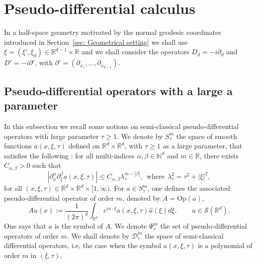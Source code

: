 \documentclass[10pt]{amsart}
\theoremstyle{plain}
\theoremstyle{definition}
\def\R{\mathbb{R}}
\def\N{\mathbb{N}}
\newcommand{\Op}{\ensuremath{\mathrm{Op}}}
\newcommand{\lsc}{\lambda_\tau}
\newcommand{\Ssc}{S_\tau}
\newcommand{\Psisc}{\Psi_\tau}
\newcommand{\Dsc}{\mathscr{D}_{\tau}}
\begin{document}
\section{Pseudo-differential calculus}
\label{sec: Psido}

In a half-space geometry motivated by the normal geodesic coordinates
introduced in Section~\ref{sec: Geometrical setting}
we shall use $\xi=(\xi',\xi_d)\in\R^{d-1}\times\R$ and we shall
consider the operators $D_d=-i\partial_d$ and $D'=-i\partial'$, with
$\partial' = (\partial_{x_1}, \dots, \partial_{x_{d-1}})$.

\subsection{Pseudo-differential operators with a large a parameter}\label{ss1}
In this subsection we recall some notions on semi-classical
pseudo-differential operators with large parameter $\tau\geq 1$. We
denote by $\Ssc^m$ the space of smooth functions $a(x,\xi,\tau)$
defined on $\R^d\times\R^d$, with $\tau\geq 1$ as a large parameter,
that satisfies the following : for all multi-indices
$\alpha,\beta\in\N^d$ and $m\in\R$, there exists
$C_{\alpha,\beta}>0$ such
that
\begin{equation*}
|\partial_x^{\alpha}\partial^{\beta}_{\xi}a(x,\xi,\tau)|
\leq C_{\alpha,\beta}\lsc^{m-|\beta|},
\ \ \text{where} \ \ \lsc^2=\tau^2+|\xi|^2,
\end{equation*}
for all
$(x,\xi,\tau)\in\R^d\times\R^d\times [1, \infty)$. For $a\in \Ssc^m$,
one defines the associated pseudo-differential operator of order $m$, denoted by
$A=\Op (a)$,
\begin{equation*}
Au(x):=\frac{1}{(2\pi)^d}
\int_{\R^d}e^{ix\cdot\xi}a(x,\xi,\tau)\hat{u}(\xi)d\xi,
\qquad u\in \mathscr{S}(\R^d).
\end{equation*}
One says that $a$ is the symbol of $A$. We denote $\Psisc^m$ the set
of pseudo-differential operators of order $m$. We shall denote by
$\Dsc^m$ the space of semi-classical differential operators, i.e, the
case when the symbol $a(x,\xi,\tau)$ is a polynomial of order
$m$ in $(\xi,\tau)$.
\end{document}
